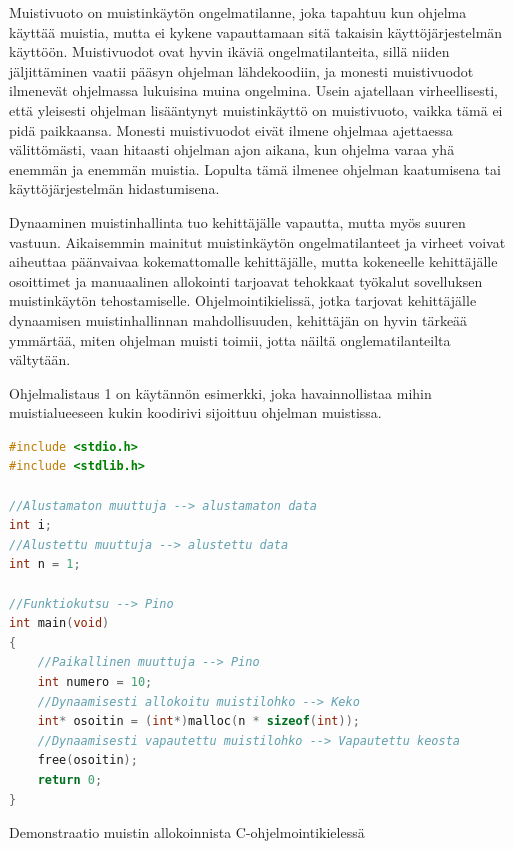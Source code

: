 Muistivuoto on muistinkäytön ongelmatilanne, joka tapahtuu kun ohjelma käyttää muistia, mutta ei kykene vapauttamaan sitä takaisin käyttöjärjestelmän käyttöön. Muistivuodot ovat hyvin ikäviä ongelmatilanteita, sillä niiden jäljittäminen vaatii pääsyn ohjelman lähdekoodiin, ja monesti muistivuodot ilmenevät ohjelmassa lukuisina muina ongelmina. Usein ajatellaan virheellisesti, että yleisesti ohjelman lisääntynyt muistinkäyttö on muistivuoto, vaikka tämä ei pidä paikkaansa. Monesti muistivuodot eivät ilmene ohjelmaa ajettaessa välittömästi, vaan hitaasti ohjelman ajon aikana, kun ohjelma varaa yhä enemmän ja enemmän muistia. Lopulta tämä ilmenee ohjelman kaatumisena tai käyttöjärjestelmän hidastumisena.\cite{mmic2010}

Dynaaminen muistinhallinta tuo kehittäjälle vapautta, mutta myös suuren vastuun. Aikaisemmin mainitut muistinkäytön ongelmatilanteet ja virheet voivat aiheuttaa päänvaivaa kokemattomalle kehittäjälle, mutta kokeneelle kehittäjälle osoittimet ja manuaalinen allokointi tarjoavat tehokkaat työkalut sovelluksen muistinkäytön tehostamiselle. Ohjelmointikielissä, jotka tarjovat kehittäjälle dynaamisen muistinhallinnan mahdollisuuden, kehittäjän on hyvin tärkeää ymmärtää, miten ohjelman muisti toimii, jotta näiltä onglematilanteilta vältytään.

Ohjelmalistaus 1 on käytännön esimerkki, joka havainnollistaa mihin muistialueeseen kukin koodirivi sijoittuu ohjelman muistissa.

\begin{algorithm}[tbh]
\begin{lstlisting}[language=C]
#include <stdio.h>
#include <stdlib.h>

//Alustamaton muuttuja --> alustamaton data
int i;
//Alustettu muuttuja --> alustettu data 
int n = 1; 

//Funktiokutsu --> Pino
int main(void)  
{  
    //Paikallinen muuttuja --> Pino
    int numero = 10;
    //Dynaamisesti allokoitu muistilohko --> Keko    
    int* osoitin = (int*)malloc(n * sizeof(int));
    //Dynaamisesti vapautettu muistilohko --> Vapautettu keosta  
    free(osoitin);
    return 0;
}
\end{lstlisting}
\caption{Demonstraatio muistin allokoinnista C-ohjelmointikielessä\label{alg:Demonstraatio}}
\end{algorithm}